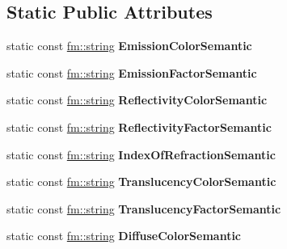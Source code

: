 \subsection*{Static Public Attributes}
\begin{DoxyCompactItemize}
\item 
\hypertarget{classFCDEffectStandard_af1b5eea66dd078d98feb51ba084900b9}{
static const \hyperlink{classfm_1_1stringT}{fm::string} {\bfseries EmissionColorSemantic}}
\label{classFCDEffectStandard_af1b5eea66dd078d98feb51ba084900b9}

\item 
\hypertarget{classFCDEffectStandard_aa1b823e9f78a3c319724d8436b5ef2c2}{
static const \hyperlink{classfm_1_1stringT}{fm::string} {\bfseries EmissionFactorSemantic}}
\label{classFCDEffectStandard_aa1b823e9f78a3c319724d8436b5ef2c2}

\item 
\hypertarget{classFCDEffectStandard_a86fdcb920b4446d4f1d3cec60f7d1deb}{
static const \hyperlink{classfm_1_1stringT}{fm::string} {\bfseries ReflectivityColorSemantic}}
\label{classFCDEffectStandard_a86fdcb920b4446d4f1d3cec60f7d1deb}

\item 
\hypertarget{classFCDEffectStandard_abff5c430934991b46c9b25d508b84b55}{
static const \hyperlink{classfm_1_1stringT}{fm::string} {\bfseries ReflectivityFactorSemantic}}
\label{classFCDEffectStandard_abff5c430934991b46c9b25d508b84b55}

\item 
\hypertarget{classFCDEffectStandard_a06389abe5788d824d94b3563465b39ef}{
static const \hyperlink{classfm_1_1stringT}{fm::string} {\bfseries IndexOfRefractionSemantic}}
\label{classFCDEffectStandard_a06389abe5788d824d94b3563465b39ef}

\item 
\hypertarget{classFCDEffectStandard_adc9fcb8d989d8f8881bc7aa850aaadb8}{
static const \hyperlink{classfm_1_1stringT}{fm::string} {\bfseries TranslucencyColorSemantic}}
\label{classFCDEffectStandard_adc9fcb8d989d8f8881bc7aa850aaadb8}

\item 
\hypertarget{classFCDEffectStandard_a8ffdda8d54e66ff7f4b88cc4062dba7e}{
static const \hyperlink{classfm_1_1stringT}{fm::string} {\bfseries TranslucencyFactorSemantic}}
\label{classFCDEffectStandard_a8ffdda8d54e66ff7f4b88cc4062dba7e}

\item 
\hypertarget{classFCDEffectStandard_ae4b1207a87546418dba682903c906135}{
static const \hyperlink{classfm_1_1stringT}{fm::string} {\bfseries DiffuseColorSemantic}}
\label{classFCDEffectStandard_ae4b1207a87546418dba682903c906135}


\end{DoxyCompactItemize}

